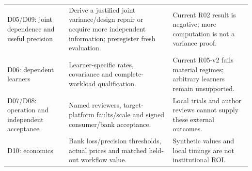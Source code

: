 \documentclass[
  11pt,
  a4paper,
]{article}
\begin{document}
\begin{longtable}[]{@{}lll@{}}
\begin{minipage}[t]{0.30\columnwidth}\raggedright
D05/D09: joint dependence and useful precision\strut
\end{minipage} & \begin{minipage}[t]{0.30\columnwidth}\raggedright
Derive a justified joint variance/design repair or acquire more
independent information; preregister fresh evaluation.\strut
\end{minipage} & \begin{minipage}[t]{0.30\columnwidth}\raggedright
Current R02 result is negative; more computation is not a variance
proof.\strut
\end{minipage}\tabularnewline
\begin{minipage}[t]{0.30\columnwidth}\raggedright
D06: dependent learners\strut
\end{minipage} & \begin{minipage}[t]{0.30\columnwidth}\raggedright
Learner-specific rates, covariance and complete-workload
qualification.\strut
\end{minipage} & \begin{minipage}[t]{0.30\columnwidth}\raggedright
Current R05-v2 fails material regimes; arbitrary learners remain
unsupported.\strut
\end{minipage}\tabularnewline
\begin{minipage}[t]{0.30\columnwidth}\raggedright
D07/D08: operation and independent acceptance\strut
\end{minipage} & \begin{minipage}[t]{0.30\columnwidth}\raggedright
Named reviewers, target-platform faults/scale and signed consumer/bank
acceptance.\strut
\end{minipage} & \begin{minipage}[t]{0.30\columnwidth}\raggedright
Local trials and author reviews cannot supply these external
outcomes.\strut
\end{minipage}\tabularnewline
\begin{minipage}[t]{0.30\columnwidth}\raggedright
D10: economics\strut
\end{minipage} & \begin{minipage}[t]{0.30\columnwidth}\raggedright
Bank loss/precision thresholds, actual prices and matched held-out
workflow value.\strut
\end{minipage} & \begin{minipage}[t]{0.30\columnwidth}\raggedright
Synthetic values and local timings are not institutional ROI.\strut
\end{minipage}\tabularnewline
\bottomrule
\end{longtable}
\end{document}
